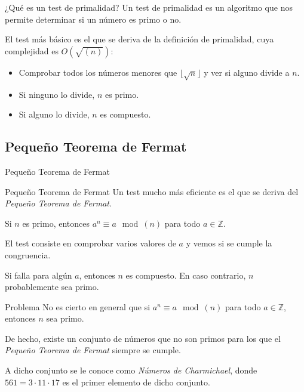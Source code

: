 \documentclass{beamer}
\begin{document}
\begin{frame}{¿Qué es un test de primalidad?}
	Un test de primalidad es un algoritmo que nos permite determinar si un número es primo o no.\break
	
	El test más básico es el que se deriva de la definición de primalidad, cuya complejidad es $O(\sqrt{(n)})$:
	
	\begin{itemize}[<+(1)->]
		\item Comprobar todos los números menores que $\lfloor\sqrt{n}\rfloor$ y ver si alguno divide a $n$.
		
		\item Si ninguno lo divide, $n$ es primo.
		
		\item Si alguno lo divide, $n$ es compuesto.
	\end{itemize}
\end{frame}

\subsection{Pequeño Teorema de Fermat}

\begin{frame}
	\centering
	\begin{Large}
		Pequeño Teorema de Fermat
	\end{Large}
\end{frame}

\begin{frame}{Pequeño Teorema de Fermat}
	\onslide<1->Un test mucho más eficiente es el que se deriva del \textit{Pequeño Teorema de Fermat}.\break
	
	\begin{theorem}
		Si $n$ es primo, entonces $a^n \equiv a \mod(n)$ para todo $a \in \mathbb{Z}$.
	\end{theorem}
	
	El test consiste en comprobar varios valores de $a$ y vemos si se cumple la congruencia.\break
	
	Si falla para algún $a$, entonces $n$ es compuesto. En caso contrario, $n$ probablemente sea primo.
\end{frame}

\begin{frame}{Problema}
	\onslide<1->No es cierto en general que si $a^n \equiv a \mod(n)$ para todo $a \in \mathbb{Z}$, entonces $n$ sea primo.\break
	
	De hecho, existe un conjunto de números que no son primos para los que el \textit{Pequeño Teorema de Fermat} siempre se cumple.\break
	
	A dicho conjunto se le conoce como \textit{Números de Charmichael}, donde $561 = 3\cdot11\cdot17$ es el primer elemento de dicho conjunto.
\end{frame}
\end{document}
